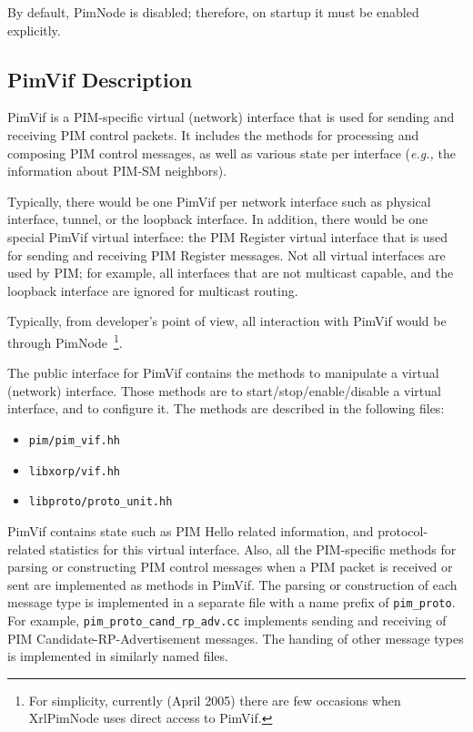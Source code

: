 \documentclass[11pt]{article}
\newcommand{\eg}{\emph{e.g.,}\xspace}
\begin{document}
By default, PimNode is disabled; therefore, on startup it must be enabled
explicitly.

\subsection{PimVif Description}

PimVif is a PIM-specific virtual (network) interface that is used for sending
and receiving PIM control packets. It includes the methods for processing and
composing PIM control messages, as well as various state per interface
(\eg the information about PIM-SM neighbors).

Typically, there would be one PimVif per network interface such as
physical interface, tunnel, or the loopback
interface. In addition, there would be one special PimVif virtual
interface: the PIM Register virtual interface that is used for sending
and receiving PIM Register messages. Not all virtual interfaces are
used by PIM; for example, all interfaces that are not multicast
capable, and the loopback interface are ignored for multicast
routing.

Typically, from developer's point of view, all interaction with PimVif
would be through PimNode~\footnote{For simplicity, currently (April 2005)
there are few occasions when XrlPimNode uses direct access to PimVif.}.

The public interface for PimVif contains the methods to manipulate a
virtual (network) interface. Those methods are to start/stop/enable/disable a
virtual interface, and to configure it. The methods are described in
the following files:

\begin{itemize}
  \item \verb=pim/pim_vif.hh=
  \item \verb=libxorp/vif.hh=
  \item \verb=libproto/proto_unit.hh=
\end{itemize}

PimVif contains state such as PIM Hello related information, and
protocol-related statistics for this virtual interface. Also, all
the PIM-specific methods for parsing or constructing PIM control
messages when a PIM packet is received or sent are implemented as
methods in PimVif. The parsing or construction of each message type is
implemented in a separate file with a name prefix of \verb=pim_proto=.
For example, \verb=pim_proto_cand_rp_adv.cc= implements sending and
receiving of PIM Candidate-RP-Advertisement messages. The handing of
other message types is implemented in similarly named files.
\end{document}
